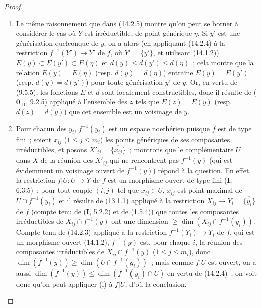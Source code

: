 \begin{proof}
\begin{enumerate}[label=(\roman*)]
  \item Le même raisonnement que dans (14.2.5) montre qu'on peut se borner à
  considérer le cas où $Y$ est irréductible, de point générique $\eta$. Si $y'$
  est une générisation quelconque de $y$, on a alors (en appliquant (14.2.4) à la
  restriction $f^{-1}(Y')\to Y'$ de $f$, où $Y'=\overline{\{y'\}}$, et utilisant
  (14.1.2)) $E(y)\subset E(y')\subset E(\eta)$ et
  $d(y)\leq d(y')\leq d(\eta)$~; cela montre que la relation $E(y)=E(\eta)$
  (resp. $d(y)=d(\eta)$) entraîne $E(y)=E(y')$ (resp. $d(y)=d(y')$) pour toute
  générisation $y'$ de $y$. Or, en vertu de (9.5.5), les fonctions $E$ et $d$ sont
  localement constructibles, donc il résulte de ($\mathbf{0}_{\mathrm{III}}$,
  9.2.5) appliqué à l'ensemble des $z$ tels que $E(z)=E(y)$ (resp.
  $d(z)=d(y)$) que cet ensemble est un voisinage de $y$.

  \item Pour chacun des $y_i$, $f^{-1}(y_i)$ est un espace noethérien puisque $f$
  est de type fini~; soient $x_{ij}$ ($1\leq j\leq m_i$) les points génériques de
  ses composantes irréductibles, et posons $X'_{ij}=\overline{\{x_{ij}\}}$~;
  montrons que le complémentaire $U$ dans $X$ de la réunion des $X'_{ij}$ qui ne
  rencontrent pas $f^{-1}(y)$ (qui est évidemment un voisinage ouvert de
  $f^{-1}(y)$) répond à la question. En effet, la restriction $f|U:U\to Y$ de $f$
  est un morphisme ouvert de type fini (\textbf{I}, 6.3.5)~; pour tout couple $(i,j)$ tel
  que $x_{ij}\in U$, $x_{ij}$ est point maximal de $U\cap f^{-1}(y_i)$ et il
  résulte de (13.1.1) appliqué à la restriction
  $X_{ij}\to Y_i=\overline{\{y_i\}}$ de $f$ (compte tenu de (\textbf{I}, 5.2.2) et de
  (1.5.4)) que toutes les composantes irréductibles de
  $X_{ij}\cap f^{-1}(y)$ ont une dimension
  $\geq\dim(X_{ij}\cap f^{-1}(y_i))$. Compte tenu de (14.2.3) appliqué à la
  restriction $f^{-1}(Y_i)\to Y_i$ de $f$, qui est un morphisme ouvert (14.1.2),
  $f^{-1}(y)$ est, pour chaque $i$, la réunion des composantes irréductibles de
  $X_{ij}\cap f^{-1}(y)$ ($1\leq j\leq m_i$), donc
  $\dim(f^{-1}(y))\geq\dim(U\cap f^{-1}(y_i))$~; mais comme $f|U$ est ouvert, on a
  aussi $\dim(f^{-1}(y))\leq\dim(f^{-1}(y_i)\cap U)$ en vertu de (14.2.4)~; on voit
  donc qu'on peut appliquer (i) à $f|U$, d'où la conclusion.
\end{enumerate}
\end{proof}

